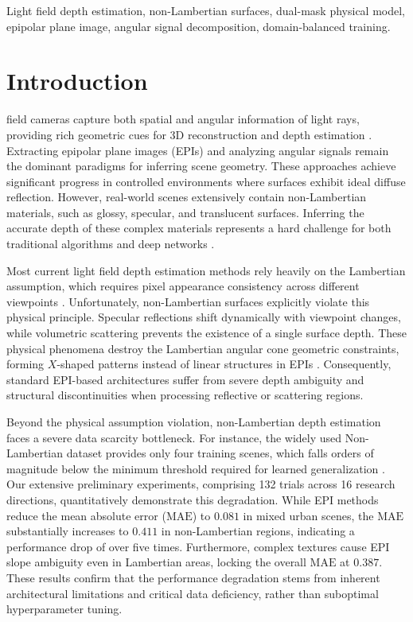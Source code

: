 \documentclass[lettersize,journal]{IEEEtran}
\begin{document}
\begin{IEEEkeywords}
Light field depth estimation, non-Lambertian surfaces, dual-mask physical model, epipolar plane image, angular signal decomposition, domain-balanced training.
\end{IEEEkeywords}

\section{Introduction}

 field cameras capture both spatial and angular information of light rays, providing rich geometric cues for 3D reconstruction and depth estimation \cite{light_field_imaging, depth_estimation}. Extracting epipolar plane images (EPIs) and analyzing angular signals remain the dominant paradigms for inferring scene geometry. These approaches achieve significant progress in controlled environments where surfaces exhibit ideal diffuse reflection. However, real-world scenes extensively contain non-Lambertian materials, such as glossy, specular, and translucent surfaces. Inferring the accurate depth of these complex materials represents a hard challenge for both traditional algorithms and deep networks \cite{non_lambertian_surfaces, specular_reflection}.

Most current light field depth estimation methods rely heavily on the Lambertian assumption, which requires pixel appearance consistency across different viewpoints \cite{photo_consistency, lambertian_assumption}. Unfortunately, non-Lambertian surfaces explicitly violate this physical principle. Specular reflections shift dynamically with viewpoint changes, while volumetric scattering prevents the existence of a single surface depth. These physical phenomena destroy the Lambertian angular cone geometric constraints, forming $X$-shaped patterns instead of linear structures in EPIs \cite{epipolar_plane_image, geometric_constraints}. Consequently, standard EPI-based architectures suffer from severe depth ambiguity and structural discontinuities when processing reflective or scattering regions.

Beyond the physical assumption violation, non-Lambertian depth estimation faces a severe data scarcity bottleneck. For instance, the widely used Non-Lambertian dataset provides only four training scenes, which falls orders of magnitude below the minimum threshold required for learned generalization \cite{non_lambertian_dataset, data_scarcity}. Our extensive preliminary experiments, comprising 132 trials across 16 research directions, quantitatively demonstrate this degradation. While EPI methods reduce the mean absolute error ($\text{MAE}$) to $0.081$ in mixed urban scenes, the $\text{MAE}$ substantially increases to $0.411$ in non-Lambertian regions, indicating a performance drop of over five times. Furthermore, complex textures cause EPI slope ambiguity even in Lambertian areas, locking the overall $\text{MAE}$ at $0.387$. These results confirm that the performance degradation stems from inherent architectural limitations and critical data deficiency, rather than suboptimal hyperparameter tuning.
\end{document}
